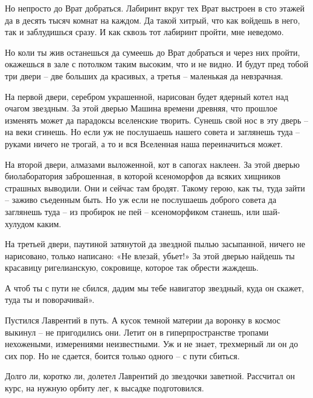 \documentclass[ebook,oneside,final,openright]{memoir}
\begin{document}
\par
Но непросто до Врат добраться. Лабиринт вкруг тех Врат выстроен в сто этажей да в десять тысяч комнат на каждом. Да такой хитрый, что как войдешь в него, так и заблудишься сразу. И как сквозь тот лабиринт пройти, мне неведомо.\par
\par
Но коли ты жив останешься да сумеешь до Врат добраться и через них пройти, окажешься в зале с потолком таким высоким, что и не видно. И будут пред тобой три двери – две больших да красивых, а третья – маленькая да невзрачная.\par
\par
На первой двери, серебром украшенной, нарисован будет ядерный котел над очагом звездным. За этой дверью Машина времени древняя, что прошлое изменять может да парадоксы вселенские творить. Сунешь свой нос в эту дверь – на веки сгинешь. Но если уж не послушаешь нашего совета и заглянешь туда – руками ничего не трогай, а то и вся Вселенная наша переиначиться может.\par
\par
На второй двери, алмазами выложенной, кот в сапогах наклеен. За этой дверью биолаборатория заброшенная, в которой ксеноморфов да всяких хищников страшных выводили. Они и сейчас там бродят. Такому герою, как ты, туда зайти – заживо съеденным быть. Но уж если не послушаешь доброго совета да заглянешь туда – из пробирок не пей – ксеноморфиком станешь, или шай-хулудом каким.\par
\par
На третьей двери, паутиной затянутой да звездной пылью засыпанной, ничего не нарисовано, только написано: «Не влезай, убьет!» За этой дверью найдешь ты красавицу ригелианскую, сокровище, которое так обрести жаждешь.\par
\par
А чтоб ты с пути не сбился, дадим мы тебе навигатор звездный, куда он скажет, туда ты и поворачивай».\par
\par
Пустился Лаврентий в путь. А кусок темной материи да воронку в космос выкинул – не пригодились они. Летит он в гиперпространстве тропами нехожеными, измерениями неизвестными. Уж и не знает, трехмерный ли он до сих пор. Но не сдается, боится только одного – с пути сбиться.\par
\par
Долго ли, коротко ли, долетел Лаврентий до звездочки заветной. Рассчитал он курс, на нужную орбиту лег, к высадке подготовился.\par
\end{document}
